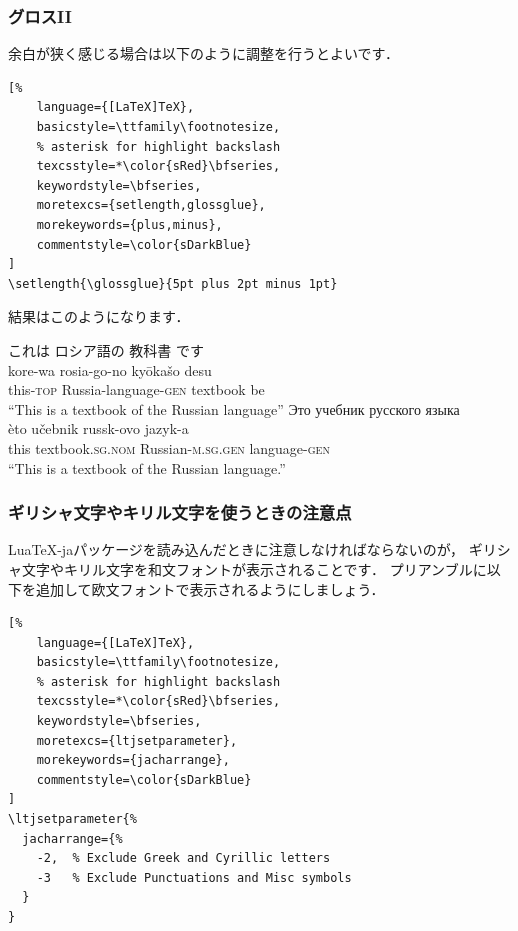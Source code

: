 \documentclass[12pt,unicode]{beamer}
\begin{document}
\begin{frame}[fragile]
\setlength{\glossglue}{5pt plus 2pt minus 1pt}\footnotesize
\frametitle{グロスII}
余白が狭く感じる場合は以下のように調整を行うとよいです．
\begin{leftbar}
\begin{lstlisting}[%
    language={[LaTeX]TeX},
    basicstyle=\ttfamily\footnotesize,
    % asterisk for highlight backslash
    texcsstyle=*\color{sRed}\bfseries,
    keywordstyle=\bfseries,
    moretexcs={setlength,glossglue},
    morekeywords={plus,minus},
    commentstyle=\color{sDarkBlue}
]
\setlength{\glossglue}{5pt plus 2pt minus 1pt}
\end{lstlisting}
\end{leftbar}

結果はこのようになります．
\begin{exe}
    \ex%
    \glll%
    {これは} {ロシア語の} {教科書} {です} \\
    {kore-wa} {rosia-go-no} {kyōkašo} {desu} \\
    {this-\textsc{top}} {Russia-language-\textsc{gen}} {textbook} {be} \\
    \trans%
    ``This is a textbook of the Russian language''
    \ex%
    \glll%
    {Это} {учебник} {русского} {языка} \\
    {èto} {učebnik} {russk-ovo} {jazyk-a} \\
    {this} {textbook.\textsc{sg.nom}} {Russian-\textsc{m.sg.gen}} {language-\textsc{gen}} \\
    \trans%
    ``This is a textbook of the Russian language.''
\end{exe}
\end{frame}


\begin{frame}[fragile]
\frametitle{ギリシャ文字やキリル文字を使うときの注意点}
Lua\TeX{}-jaパッケージを読み込んだときに注意しなければならないのが，
ギリシャ文字やキリル文字を和文フォントが表示されることです．
プリアンブルに以下を追加して欧文フォントで表示されるようにしましょう．
\begin{leftbar}
\begin{lstlisting}[%
    language={[LaTeX]TeX},
    basicstyle=\ttfamily\footnotesize,
    % asterisk for highlight backslash
    texcsstyle=*\color{sRed}\bfseries,
    keywordstyle=\bfseries,
    moretexcs={ltjsetparameter},
    morekeywords={jacharrange},
    commentstyle=\color{sDarkBlue}
]
\ltjsetparameter{%
  jacharrange={%
    -2,  % Exclude Greek and Cyrillic letters
    -3   % Exclude Punctuations and Misc symbols
  }
}
\end{lstlisting}
\end{leftbar}
\end{frame}
\end{document}
